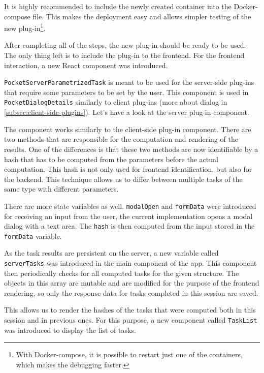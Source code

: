 It is highly recommended to include the newly created container into the Docker-compose file. This makes the deployment easy and allows simpler testing of the new plug-in\footnote{With Docker-compose, it is possible to restart just one of the containers, which makes the debugging faster.}.

After completing all of the steps, the new plug-in should be ready to be used. The only thing left is to include the plug-in to the frontend. For the frontend interaction, a new React component was introduced.

\texttt{PocketServerParametrizedTask} is meant to be used for the server-side plug-ins that require some parameters to be set by the user. This component is used in \texttt{PocketDialogDetails} similarly to client plug-ins (more about dialog in \cref{subsec:client-side-plugins}). Let's have a look at the server plug-in component.



The component works similarly to the client-side plug-in component. There are two methods that are responsible for the computation and rendering of the results. One of the differences is that these two methods are now identifiable by a hash that has to be computed from the parameters before the actual computation. This hash is not only used for frontend identification, but also for the backend. This technique allows us to differ between multiple tasks of the same type with different parameters.

There are more state variables as well. \texttt{modalOpen} and \texttt{formData} were introduced for receiving an input from the user, the current implementation opens a modal dialog with a text area. The \texttt{hash} is then computed from the input stored in the \texttt{formData} variable.

As the task results are persistent on the server, a new variable called \texttt{serverTasks} was introduced in the main component of the app. This component then periodically checks for all computed tasks for the given structure. The objects in this array are mutable and are modified for the purpose of the frontend rendering, so only the response data for tasks completed in this session are saved.

This allows us to render the hashes of the tasks that were computed both in this session and in previous ones. For this purpose, a new component called \texttt{TaskList} was introduced to display the list of tasks. 

